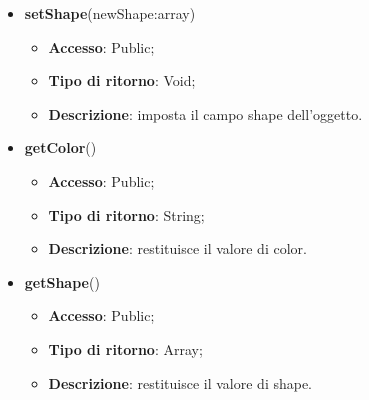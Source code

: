 {{\begin{itemize}
\begin{itemize}
				\item \textbf{Tipo di ritorno}: Void;
				\item \textbf{Descrizione}: imposta il campo color dell’oggetto.
			\end{itemize}
			\item \textbf{setShape}(newShape:array)
			\begin{itemize}
				\item \textbf{Accesso}: Public;
				\item \textbf{Tipo di ritorno}: Void;
				\item \textbf{Descrizione}: imposta il campo shape dell’oggetto.
			\end{itemize}
			\item \textbf{getColor}()
			\begin{itemize}
				\item \textbf{Accesso}: Public;
				\item \textbf{Tipo di ritorno}: String;
				\item \textbf{Descrizione}: restituisce il valore di color.
			\end{itemize}
			\item \textbf{getShape}()
			\begin{itemize}
				\item \textbf{Accesso}: Public;
				\item \textbf{Tipo di ritorno}: Array;
				\item \textbf{Descrizione}: restituisce il valore di shape.
			\end{itemize}
		\end{itemize}
		}
}
